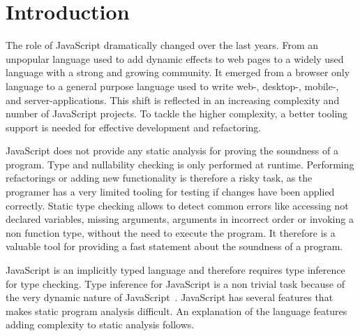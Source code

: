 \section{Introduction}
The role of JavaScript dramatically changed over the last years. From an unpopular language used to add dynamic effects to web pages to a widely used language with a strong and growing community. It emerged from a browser only language to a general purpose language used to write web-,  desktop-, mobile-, and server-applications. This shift is reflected in an increasing complexity and number of JavaScript projects. To tackle the higher complexity, a better tooling support is needed for effective development and refactoring.  

JavaScript does not provide any static analysis for proving the soundness of a program. Type and nullability checking is only performed at runtime. Performing refactorings or adding new functionality is therefore a risky task, as the programer has a very limited tooling for testing if changes have been applied correctly. Static type checking allows to detect common errors like accessing not declared variables, missing arguments, arguments in incorrect order or invoking a non function type, without the need to execute the program. It therefore is a valuable tool for providing a fast statement about the soundness of a program.

JavaScript is an implicitly typed language and therefore requires type inference for type checking. Type inference for JavaScript is a non trivial task because of the very dynamic nature of JavaScript~\cite{JensenMollerThiemann2009}. JavaScript has several features that makes static program analysis difficult. An explanation of the language features adding complexity to static analysis follows.

